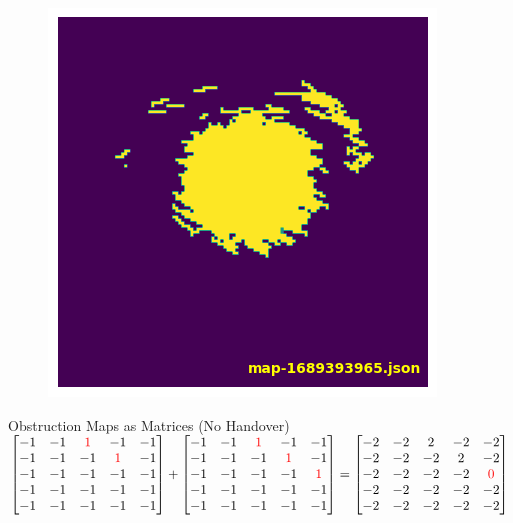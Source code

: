 \documentclass[NET,english,beameralt]{tumbeamer}
\begin{document}
\begin{frame}[fragile]
    \begin{figure}
        \includegraphics[width=0.4\columnwidth]{pics/map4.png}
    \end{figure}
\end{frame}


\begin{frame}{Obstruction Maps as Matrices (No Handover)}
    $\begin{bmatrix}
        -1 & -1 & \color{red}1 &           -1 & -1 \\
        -1 & -1 &           -1 & \color{red}1 & -1 \\
        -1 & -1 &           -1 &           -1 & -1 \\
        -1 & -1 &           -1 &           -1 & -1 \\
        -1 & -1 &           -1 &           -1 & -1 \\ 
        \end{bmatrix}
        +
        \begin{bmatrix}
        -1 & -1 & \color{red}1 &           -1 &           -1 \\
        -1 & -1 &           -1 & \color{red}1 &           -1 \\
        -1 & -1 &           -1 &           -1 & \color{red}1 \\
        -1 & -1 &           -1 &           -1 &           -1 \\
        -1 & -1 &           -1 &           -1 &           -1 \\
        \end{bmatrix}
        =
        \begin{bmatrix}
        -2 & -2 & 2 &  -2 &           -2 \\
        -2 & -2 & -2 &  2 &           -2 \\
        -2 & -2 & -2 & -2 & \color{red}0 \\
        -2 & -2 & -2 & -2 &            -2 \\
        -2 & -2 & -2 & -2 &            -2 \\
    \end{bmatrix}$
\end{frame}
\end{document}
